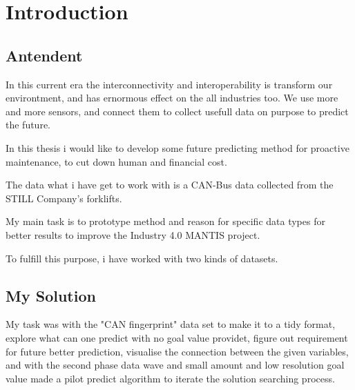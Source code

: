 \chapter*{Introduction}
\section{Antendent}
In this current era the interconnectivity and interoperability is transform our environtment, and has ernormous effect on the all industries too. We use more and more sensors, and connect them to collect usefull data on purpose to predict the future.

In this thesis i would like to develop some future predicting method for proactive maintenance, to cut down human and financial cost.

The data what i have get to work with is a CAN-Bus data collected from the STILL Company's forklifts.

My main task is to prototype method and reason for specific data types for better results to improve the Industry 4.0 MANTIS project.

To fulfill this purpose, i have worked with two kinds of datasets.
\section{My Solution}
My task was with the "CAN fingerprint" data set to make it to a tidy format, explore what can one predict with no goal value providet, figure out requirement for future better prediction, visualise the connection between the given variables, and with the second phase data wave and small amount and low resolution goal value made a pilot predict algorithm to iterate the solution searching process. 

